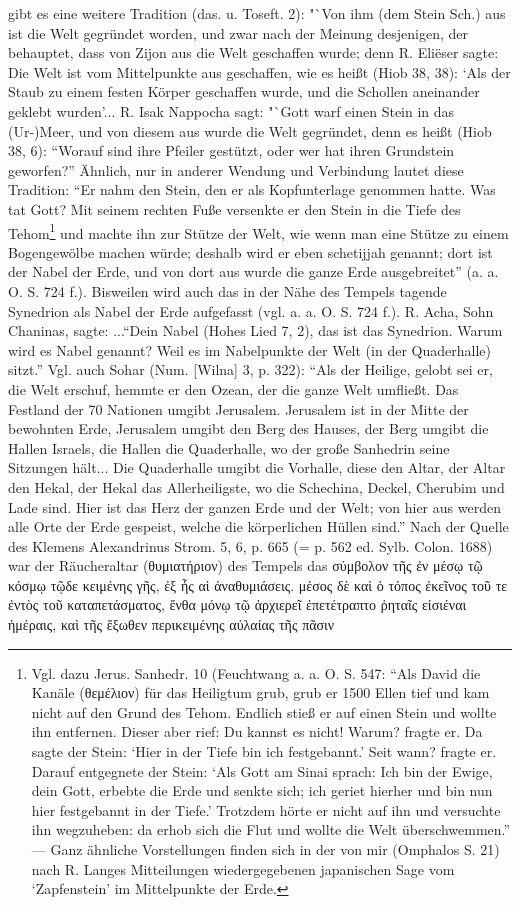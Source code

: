 \documentclass[a4paper, 11pt, oneside]{article}
\begin{document}
gibt es eine weitere Tradition (das. u. Toseft. 2): "`Von ihm (dem Stein Sch.) aus ist die Welt gegründet worden, und zwar nach der Meinung desjenigen, der behauptet, dass von Zijon aus die Welt geschaffen wurde; denn R. Eliëser sagte: Die Welt ist vom Mittelpunkte aus geschaffen, wie es heißt (Hiob 38, 38): `Als der Staub zu einem festen Körper geschaffen wurde, und die Schollen aneinander geklebt wurden'... R. Isak Nappocha sagt: "`Gott warf einen Stein in das (Ur-)Meer, und von diesem aus wurde die Welt gegründet, denn es heißt (Hiob 38, 6): "`Worauf sind ihre Pfeiler gestützt, oder wer hat ihren Grundstein geworfen?"' Ähnlich, nur in anderer Wendung und Verbindung lautet diese Tradition: "`Er nahm den Stein, den er als Kopfunterlage genommen hatte. Was tat Gott? Mit seinem rechten Fuße versenkte er den Stein in die Tiefe des Tehom\footnote{Vgl. dazu Jerus. Sanhedr. 10 (Feuchtwang a. a. O. S. 547: "`Als David die Kanäle (θεμέλιον) für das Heiligtum grub, grub er 1500 Ellen tief und kam nicht auf den Grund des Tehom. Endlich stieß er auf einen Stein und wollte ihn entfernen. Dieser aber rief: Du kannst es nicht! Warum? fragte er. Da sagte der Stein: `Hier in der Tiefe bin ich festgebannt.' Seit wann? fragte er. Darauf entgegnete der Stein: `Als Gott am Sinai sprach: Ich bin der Ewige, dein Gott, erbebte die Erde und senkte sich; ich geriet hierher und bin nun hier festgebannt in der Tiefe.' Trotzdem hörte er nicht auf ihn und versuchte ihn wegzuheben: da erhob sich die Flut und wollte die Welt überschwemmen."' --- Ganz ähnliche Vorstellungen finden sich in der von mir (Omphalos S. 21) nach R. Langes Mitteilungen wiedergegebenen japanischen Sage vom `Zapfenstein' im Mittelpunkte der Erde.} und machte ihn zur Stütze der Welt, wie wenn man eine Stütze zu einem Bogengewölbe machen würde; deshalb wird er eben schetijjah genannt; dort ist der Nabel der Erde, und von dort aus wurde die ganze Erde ausgebreitet"' (a. a. O. S. 724 f.). Bisweilen wird auch das in der Nähe des Tempels tagende Synedrion als Nabel der Erde aufgefasst (vgl. a. a. O. S. 724 f.). R. Acha, Sohn Chaninas, sagte: ..."`Dein Nabel (Hohes Lied 7, 2), das ist das Synedrion. Warum wird es Nabel genannt? Weil es im Nabelpunkte der Welt (in der Quaderhalle) sitzt."' Vgl. auch Sohar (Num. [Wilna] 3, p. 322): "`Als der Heilige, gelobt sei er, die Welt erschuf, hemmte er den Ozean, der die ganze Welt umfließt. Das Festland der 70 Nationen umgibt Jerusalem. Jerusalem ist in der Mitte der bewohnten Erde, Jerusalem umgibt den Berg des Hauses, der Berg umgibt die Hallen Israels, die Hallen die Quaderhalle, wo der große Sanhedrin seine Sitzungen hält... Die Quaderhalle umgibt die Vorhalle, diese den Altar, der Altar den Hekal, der Hekal das Allerheiligste, wo die Schechina, Deckel, Cherubim und Lade sind. Hier ist das Herz der ganzen Erde und der Welt; von hier aus werden alle Orte der Erde gespeist, welche die körperlichen Hüllen sind."' Nach der Quelle des Klemens Alexandrinus Strom. 5, 6, p. 665 (= p. 562 ed. Sylb. Colon. 1688) war der Räucheraltar (θυμιατήριον) des Tempels das σύμβολον τῆς ἐν μέσῳ τῷ κόσμῳ τῷδε κειμένης γῆς, ἐξ ἧς αἱ ἀναθυμιάσεις. μέσος δὲ καὶ ὁ τόπος ἐκεῖνος τοῦ τε ἐντὸς τοῦ καταπετάσματος, ἔνθα μόνῳ τῷ ἀρχιερεῖ ἐπετέτραπτο ῥηταῖς εἰσιέναι ἡμέραις, καὶ τῆς ἔξωθεν περικειμένης αὐλαίας τῆς πᾶσιν 
\end{document}
